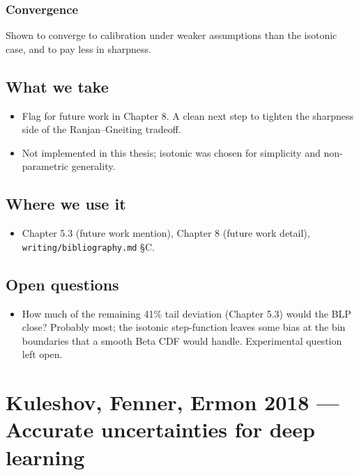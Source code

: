 \documentclass[11pt,a4paper,openany]{report}
\begin{document}
\subsection{Convergence}

Shown to converge to calibration under weaker assumptions than the
isotonic case, and to pay less in sharpness.

\section{What we take}

\begin{itemize}
  \item Flag for future work in Chapter 8. A clean next step to tighten
    the sharpness side of the Ranjan–Gneiting tradeoff.
  \item Not implemented in this thesis; isotonic was chosen for
    simplicity and non-parametric generality.
\end{itemize}

\section{Where we use it}

\begin{itemize}
  \item Chapter 5.3 (future work mention), Chapter 8 (future work detail),
    \texttt{writing/bibliography.md} §C.
\end{itemize}

\section{Open questions}

\begin{itemize}
  \item How much of the remaining 41\% tail deviation (Chapter 5.3) would the
    BLP close? Probably most; the isotonic step-function leaves some
    bias at the bin boundaries that a smooth Beta CDF would handle.
    Experimental question left open.
\end{itemize}

\chapter{Kuleshov, Fenner, Ermon 2018 — Accurate uncertainties for deep learning}
\end{document}
